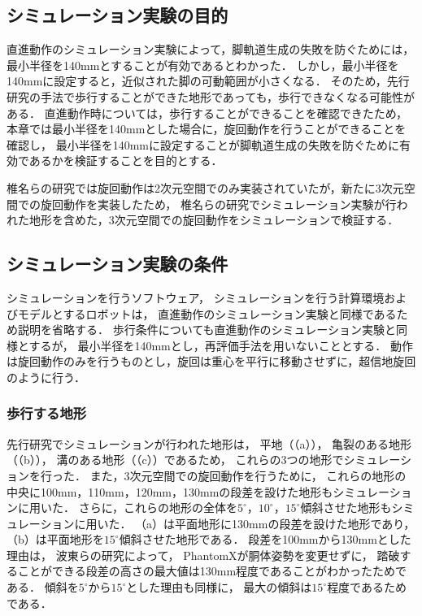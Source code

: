 
\subsection{シミュレーション実験の目的}
直進動作のシミュレーション実験によって，脚軌道生成の失敗を防ぐためには，最小半径を140mmとすることが有効であるとわかった．
しかし，最小半径を140mmに設定すると，近似された脚の可動範囲が小さくなる．
そのため，先行研究の手法で歩行することができた地形であっても，歩行できなくなる可能性がある．
直進動作時については，歩行することができることを確認できたため，
本章では最小半径を140mmとした場合に，旋回動作を行うことができることを確認し，
最小半径を140mmに設定することが脚軌道生成の失敗を防ぐために有効であるかを検証することを目的とする．

椎名らの研究では旋回動作は2次元空間でのみ実装されていたが，新たに3次元空間での旋回動作を実装したため，
椎名らの研究でシミュレーション実験が行われた地形を含めた，3次元空間での旋回動作をシミュレーションで検証する．

\subsection{シミュレーション実験の条件}
シミュレーションを行うソフトウェア，
シミュレーションを行う計算環境およびモデルとするロボットは，
直進動作のシミュレーション実験と同様であるため説明を省略する．
歩行条件についても直進動作のシミュレーション実験と同様とするが，
最小半径を140mmとし，再評価手法を用いないこととする．
動作は旋回動作のみを行うものとし，旋回は重心を平行に移動させずに，超信地旋回のように行う．

\subsubsection{歩行する地形}
先行研究でシミュレーションが行われた地形は，
平地（（a）），
亀裂のある地形（（b）），
溝のある地形（（c））であるため，
これらの3つの地形でシミュレーションを行った．
また，3次元空間での旋回動作を行うために，
これらの地形の中央に100mm，110mm，120mm，130mmの段差を設けた地形もシミュレーションに用いた．
さらに，これらの地形の全体を$5^{\circ}$，$10^{\circ}$，$15^{\circ}$傾斜させた地形もシミュレーションに用いた．
（a）は平面地形に130mmの段差を設けた地形であり，
（b）は平面地形を$15^{\circ}$傾斜させた地形である．
段差を100mmから130mmとした理由は，
波東らの研究によって，
PhantomXが胴体姿勢を変更せずに，
踏破することができる段差の高さの最大値は130mm程度であることがわかったためである．
傾斜を$5^{\circ}$から$15^{\circ}$とした理由も同様に，
最大の傾斜は$15^{\circ}$程度であるためである．

